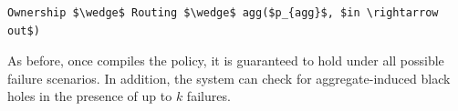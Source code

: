 \begin{lstlisting}[mathescape=true]
Ownership $\wedge$ Routing $\wedge$ agg($p_{agg}$, $in \rightarrow out$)
\end{lstlisting}

As before, once \sysname compiles the policy, it is guaranteed to hold under 
all possible failure scenarios. In addition, the system can check for 
aggregate-induced black holes in the presence of up to $k$ failures. 


%
%
%
%

